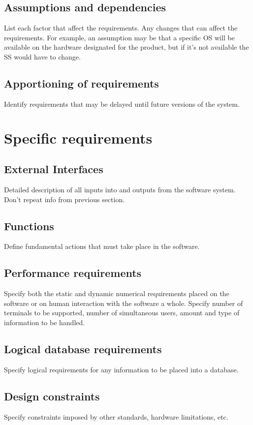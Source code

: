 \documentclass[letterpaper,10pt,draftclsnofoot,onecolumn,titlepage]{IEEEtran}
\begin{document}
	\subsection{Assumptions and dependencies}
	List each factor that affect the requirements.
	Any changes that can affect the requirements.
	For example, an assumption may be that a specific OS will be available on the hardware designated for the product, but if it's not available the SS would have to change.

	\subsection{Apportioning of requirements}
	Identify requirements that may be delayed until future versions of the system.

	\section{Specific requirements}
	\subsection{External Interfaces}
	Detailed description of all inputs into and outputs from the software system. Don't repeat info from previous section.

	\subsection{Functions}
	Define fundamental actions that must take place in the software.

	\subsection{Performance requirements}
	Specify both the static and dynamic numerical requirements placed on the software or on human interaction with the software a whole.
	Specify number of terminals to be supported, number of simultaneous users, amount and type of information to be handled.

	\subsection{Logical database requirements}
	Specify logical requirements for any information to be placed into a database.

	\subsection{Design constraints}
	Specify constraints imposed by other standards, hardware limitations, etc.
\end{document}
